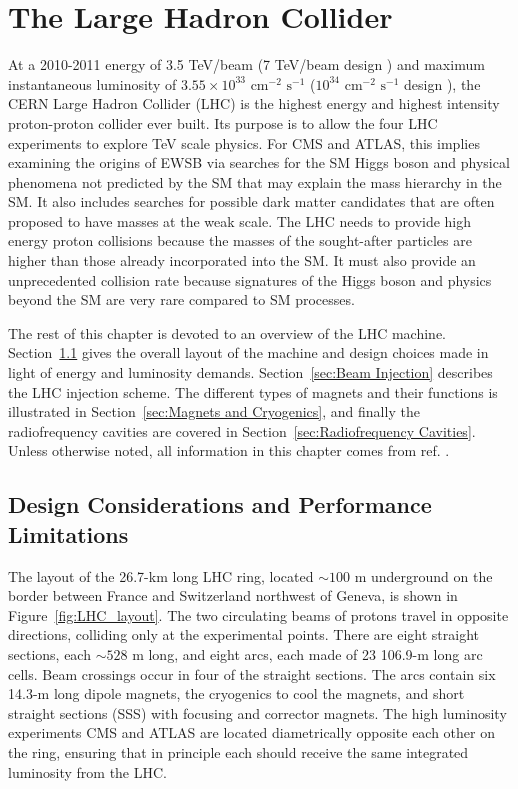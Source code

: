 \documentclass[dissertation.tex]{subfiles}
\begin{document}
\chapter{The Large Hadron Collider}
\label{chap:The Large Hadron Collider}

At a 2010-2011 energy of 3.5 TeV/beam (7 TeV/beam design \cite{1748-0221-3-08-S08001}) and maximum instantaneous luminosity of $3.55 \times 10^{33}\mbox{ cm}^{-2}\mbox{ s}^{-1}$ \cite{CMS_2011_summary} ($10^{34}\mbox{ cm}^{-2}\mbox{ s}^{-1}$ design \cite{1748-0221-3-08-S08001}), the CERN Large Hadron Collider (LHC) is the highest energy and highest intensity proton-proton collider ever built.  Its purpose is to allow the four LHC experiments to explore TeV scale physics.  For CMS and ATLAS, this implies examining the origins of EWSB via searches for the SM Higgs boson and physical phenomena not predicted by the SM that may explain the mass hierarchy in the SM.  It also includes searches for possible dark matter candidates that are often proposed to have masses at the weak scale.  The LHC needs to provide high energy proton collisions because the masses of the sought-after particles are higher than those already incorporated into the SM.  It must also provide an unprecedented collision rate because signatures of the Higgs boson and physics beyond the SM are very rare compared to SM processes.

The rest of this chapter is devoted to an overview of the LHC machine.  Section~\ref{sec:Design Considerations and Performance Limitations} gives the overall layout of the machine and design choices made in light of energy and luminosity demands.  Section~\ref{sec:Beam Injection} describes the LHC injection scheme.  The different types of magnets and their functions is illustrated in Section~\ref{sec:Magnets and Cryogenics}, and finally the radiofrequency cavities are covered in Section~\ref{sec:Radiofrequency Cavities}.  Unless otherwise noted, all information in this chapter comes from ref. \cite{1748-0221-3-08-S08001}.

\section{Design Considerations and Performance Limitations}
\label{sec:Design Considerations and Performance Limitations}

The layout of the 26.7-km long \cite{LHC_public} LHC ring, located $\sim100$ m underground on the border between France and Switzerland northwest of Geneva, is shown in Figure~\ref{fig:LHC_layout}.  The two circulating beams of protons travel in opposite directions, colliding only at the experimental points.  There are eight straight sections, each $\sim528$ m long, and eight arcs, each made of 23 106.9-m long arc cells.  Beam crossings occur in four of the straight sections.  The arcs contain six 14.3-m long dipole magnets, the cryogenics to cool the magnets, and short straight sections (SSS) with focusing and corrector magnets.  The high luminosity experiments CMS and ATLAS are located diametrically opposite each other on the ring, ensuring that in principle each should receive the same integrated luminosity from the LHC.
\end{document}
